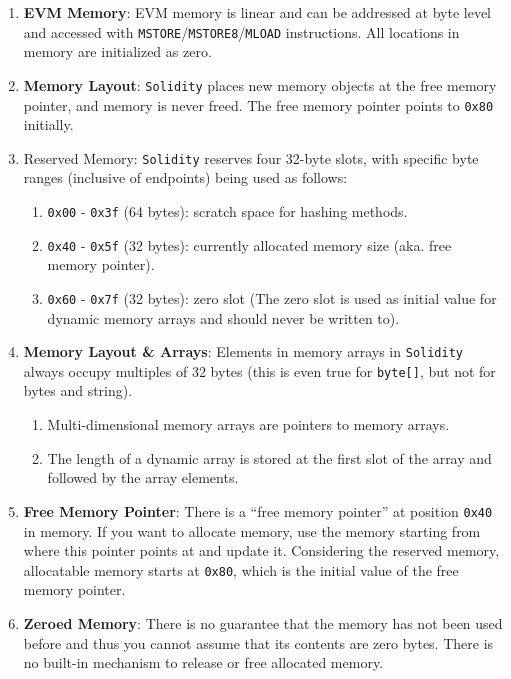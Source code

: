 \begin{enumerate}
\item\textbf{EVM Memory}: EVM memory is linear and can be addressed at byte level and accessed with \verb|MSTORE|/\verb|MSTORE8|/\verb|MLOAD| instructions. All locations in memory are initialized as zero.

\item\textbf{Memory Layout}: \verb|Solidity| places new memory objects at the free memory pointer, and memory is never freed. The free memory pointer points to \verb|0x80| initially.

\item Reserved Memory: \verb|Solidity| reserves four 32-byte slots, with specific byte ranges (inclusive of endpoints) being used as follows:
    \begin{enumerate}
	\item\verb|0x00| - \verb|0x3f| (64 bytes): scratch space for hashing methods.
	\item\verb|0x40| - \verb|0x5f| (32 bytes): currently allocated memory size (aka. free memory pointer).
	\item\verb|0x60| - \verb|0x7f| (32 bytes): zero slot (The zero slot is used as initial value for dynamic memory arrays and should never be written to).
    \end{enumerate}

\item\textbf{Memory Layout \& Arrays}: Elements in memory arrays in \verb|Solidity| always occupy multiples of 32 bytes (this is even true for \verb|byte[]|, but not for bytes and string).
    \begin{enumerate}
	\item Multi-dimensional memory arrays are pointers to memory arrays.
	\item The length of a dynamic array is stored at the first slot of the array and followed by the array elements.
    \end{enumerate}

\item\textbf{Free Memory Pointer}: There is a “free memory pointer” at position \verb|0x40| in memory. If you want to allocate memory, use the memory starting from where this pointer points at and update it. Considering the reserved memory, allocatable memory starts at \verb|0x80|, which is the initial value of the free memory pointer.

\item\textbf{Zeroed Memory}: There is no guarantee that the memory has not been used before and thus you cannot assume that its contents are zero bytes. There is no built-in mechanism to release or free allocated memory.


\end{enumerate}
